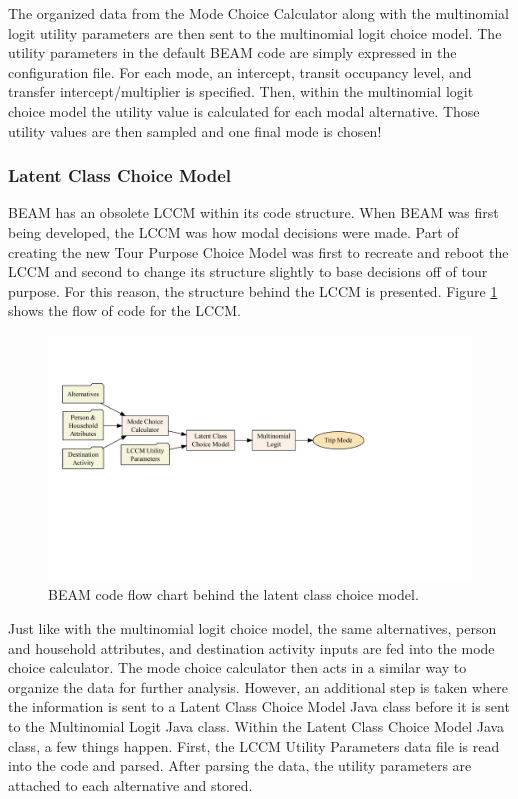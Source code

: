 \documentclass[12pt, oneside, openright]{byuthesis}
\begin{document}
The organized data from the Mode Choice Calculator along with the multinomial logit utility parameters are then sent to the multinomial logit choice model. The utility parameters in the default BEAM code are simply expressed in the configuration file. For each mode, an intercept, transit occupancy level, and transfer intercept/multiplier is specified. Then, within the multinomial logit choice model the utility value is calculated for each modal alternative. Those utility values are then sampled and one final mode is chosen!

\hypertarget{latent-class-choice-model}{%
\subsubsection{Latent Class Choice Model}\label{latent-class-choice-model}}

BEAM has an obsolete LCCM within its code structure. When BEAM was first being developed, the LCCM was how modal decisions were made. Part of creating the new Tour Purpose Choice Model was first to recreate and reboot the LCCM and second to change its structure slightly to base decisions off of tour purpose. For this reason, the structure behind the LCCM is presented. Figure \ref{fig:lccmflow} shows the flow of code for the LCCM.

\begin{figure}

{\centering \includegraphics[width=650px]{thesis_files/figure-latex/lccmflow-1} 

}

\caption{BEAM code flow chart behind the latent class choice model.}\label{fig:lccmflow}
\end{figure}

Just like with the multinomial logit choice model, the same alternatives, person and household attributes, and destination activity inputs are fed into the mode choice calculator. The mode choice calculator then acts in a similar way to organize the data for further analysis. However, an additional step is taken where the information is sent to a Latent Class Choice Model Java class before it is sent to the Multinomial Logit Java class. Within the Latent Class Choice Model Java class, a few things happen. First, the LCCM Utility Parameters data file is read into the code and parsed. After parsing the data, the utility parameters are attached to each alternative and stored.
\end{document}

